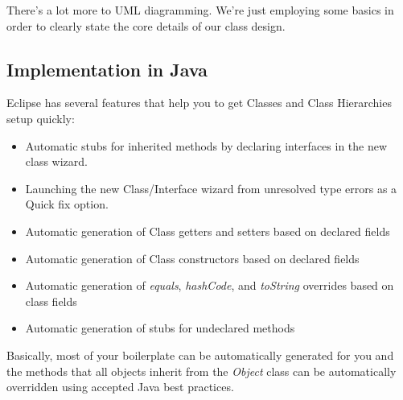 \documentclass[]{tufte-handout}
\begin{document}
There's a lot more to UML diagramming. We're just employing some basics in order to clearly state the core details of our class design.



\subsection{Implementation in Java}

Eclipse has several features that help you to get Classes and Class Hierarchies setup quickly:
\begin{itemize}
\item Automatic stubs for inherited methods by declaring interfaces in the new class wizard.
\item Launching the new Class/Interface wizard from unresolved type errors as a Quick fix option.
\item Automatic generation of Class getters and setters based on declared fields
\item Automatic generation of Class constructors based on declared fields
\item Automatic generation of \textit{equals}, \textit{hashCode}, and \textit{toString} overrides based on class fields
\item Automatic generation of stubs for undeclared methods
\end{itemize}
Basically, most of your boilerplate can be automatically generated for you and the methods that all objects inherit from the \textit{Object} class can be automatically overridden using accepted Java best practices.  
\end{document}
